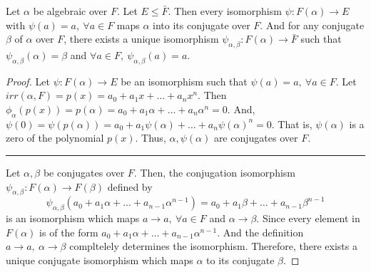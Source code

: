 \begin{corollary}
	Let $\alpha$ be algebraic over $F$.
	Let $E \le \bar{F}$.
	Then every isomorphism $\psi : F(\alpha) \to E$ with $\psi(a) = a,\ \forall a \in F$ maps $\alpha$ into its conjugate over $F$.
	And for any conjugate $\beta$ of $\alpha$ over $F$, there exists a unique isomorphism $\psi_{\alpha,\beta} : F(\alpha) \to \bar{F}$ such that $\psi_{\alpha,\beta}(\alpha) = \beta$ and $\forall a \in F,\ \psi_{\alpha,\beta}(a) = a$.
\end{corollary}
\begin{proof} 
	Let $\psi : F(\alpha) \to E$ be an isomorphism such that $\psi(a) = a,\ \forall a \in F$.
	Let $irr(\alpha,F) = p(x) = a_0 + a_1x + \dots + a_nx^n$.
	Then $\phi_\alpha(p(x)) = p(\alpha) = a_0 + a_1\alpha + \dots + a_n \alpha^n = 0$.
	And, $\psi(0) = \psi(p(\alpha)) = a_0 + a_1 \psi(\alpha) + \dots + a_n \psi(\alpha)^n = 0$.
	That is, $\psi(\alpha)$ is a zero of the polynomial $p(x)$.
	Thus, $\alpha,\psi(\alpha)$ are conjugates over $F$.\\

	\hrule\vspace{1em}

	Let $\alpha,\beta$ be conjugates over $F$.
	Then, the conjugation isomorphism $\psi_{\alpha,\beta} : F(\alpha) \to F(\beta)$ defined by
	\[ \psi_{\alpha,\beta}(a_0 + a_1\alpha + \dots + a_{n-1} \alpha^{n-1}) = a_0 + a_1 \beta + \dots + a_{n-1} \beta^{n-1} \]
	is an isomorphism which maps $a \to a,\ \forall a \in F$ and $\alpha \to \beta$.
	Since every element in $F(\alpha)$ is of the form $a_0 + a_1 \alpha + \dots + a_{n-1}\alpha^{n-1}$.
	And the definition $a \to a,\ \alpha \to \beta$ compltelely determines the isomorphism.
	Therefore, there exists a unique conjugate isomorphism which maps $\alpha$ to its conjugate $\beta$.
\end{proof} 

